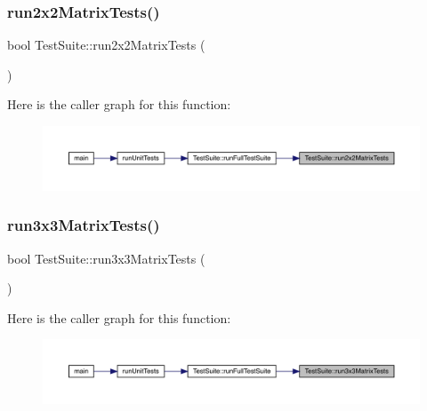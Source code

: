 \subsubsection{\texorpdfstring{run2x2MatrixTests()}{run2x2MatrixTests()}}
{\footnotesize\ttfamily bool Test\+Suite\+::run2x2\+Matrix\+Tests (\begin{DoxyParamCaption}{ }\end{DoxyParamCaption})}

Here is the caller graph for this function\+:
\nopagebreak
\begin{figure}[H]
\begin{center}
\leavevmode
\includegraphics[width=350pt]{class_test_suite_acf6d1ad1920132a4aed74457bb2df8cb_icgraph}
\end{center}
\end{figure}
\mbox{\label{class_test_suite_a91444c36a86d453cc9922d888b248a6b}} 
\subsubsection{\texorpdfstring{run3x3MatrixTests()}{run3x3MatrixTests()}}
{\footnotesize\ttfamily bool Test\+Suite\+::run3x3\+Matrix\+Tests (\begin{DoxyParamCaption}{ }\end{DoxyParamCaption})}

Here is the caller graph for this function\+:
\nopagebreak
\begin{figure}[H]
\begin{center}
\leavevmode
\includegraphics[width=350pt]{class_test_suite_a91444c36a86d453cc9922d888b248a6b_icgraph}
\end{center}
\end{figure}
\mbox{\label{class_test_suite_a0597dcd7c68390ac33d8095f2a76ae0f}} 
